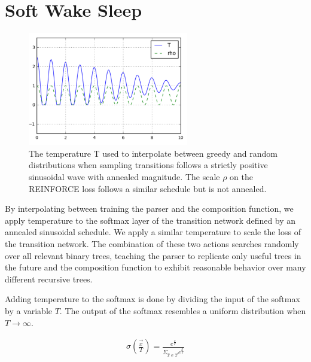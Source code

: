 \documentclass[11pt,a4paper]{article}
\begin{document}
\section{Soft Wake Sleep}

\begin{figure}[h]
\centering
\includegraphics[width=7cm]{temperature_schedule}
\caption{The temperature T used to interpolate between greedy and random distributions when sampling transitions follows a strictly positive sinusoidal wave with annealed magnitude. The scale $\rho$ on the REINFORCE loss follows a similar schedule but is not annealed.}
\end{figure}

By interpolating between training the parser and the composition function, we apply
temperature to the softmax layer of the transition network defined by an annealed
sinusoidal schedule. We apply a similar temperature to scale the loss of the transition
network. The combination of these two actions searches randomly over all relevant binary
trees, teaching the parser to replicate only useful trees in the future and the composition
function to exhibit reasonable behavior over many different recursive trees.

Adding temperature to the softmax is done by dividing the input of the softmax by a variable
$T$. The output of the softmax resembles a uniform distribution when $T\to\infty$.

\begin{align}
\sigma(\frac{\vec{x}}{T}) = \frac{e^{\frac{x}{T}}}{\Sigma_{\hat{x} \in \vec{x}} e^{\frac{\hat{x}}{T}}}
\end{align}

\end{document}
